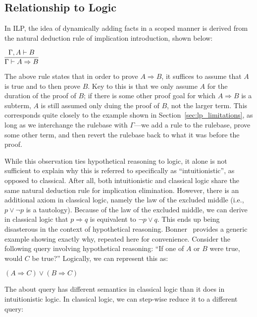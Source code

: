 \subsection{Relationship to Logic}
In ILP, the idea of dynamically adding facts in a scoped manner is derived from the natural deduction rule of implication introduction, shown below:

\begin{center}
  $\infer{\Gamma \vdash A \Rightarrow B}{\Gamma, A \vdash B}$
\end{center}

\noindent The above rule states that in order to prove $A \Rightarrow B$, it suffices to assume that $A$ is true and to then prove $B$.
Key to this is that we only assume $A$ for the duration of the proof of $B$; if there is some other proof goal for which $A \Rightarrow B$ is a subterm, $A$ is still assumed only duing the proof of $B$, not the larger term.
This corresponds quite closely to the example shown in Section~\ref{sec:lp_limitations}, as long as we interchange the rulebase with $\Gamma$---we add a rule to the rulebase, prove some other term, and then revert the rulebase back to what it was before the proof.

While this observation ties hypothetical reasoning to logic, it alone is not sufficient to explain why this is referred to specifically as ``intuitionistic'', as opposed to classical.
After all, both intuitionistic and classical logic share the same natural deduction rule for implication elimination.
However, there is an additional axiom in classical logic, namely the law of the excluded middle (i.e., $p \lor \neg p$ is a tautology).
Because of the law of the excluded middle, we can derive in classical logic that $p \Rightarrow q$ is equivalent to $\neg p \lor q$.
This ends up being disasterous in the context of hypothetical reasoning.
Bonner~\cite{Bonner88} provides a generic example showing exactly why, repeated here for convenience.
Consider the following query involving hypothetical reasoning: ``If one of $A$ or $B$ were true, would $C$ be true?''
Logically, we can represent this as:

\begin{center}
  $(A \Rightarrow C) \lor (B \Rightarrow C)$
\end{center}

\noindent The about query has different semantics in classical logic than it does in intuitionistic logic.
In classical logic, we can step-wise reduce it to a different query:

